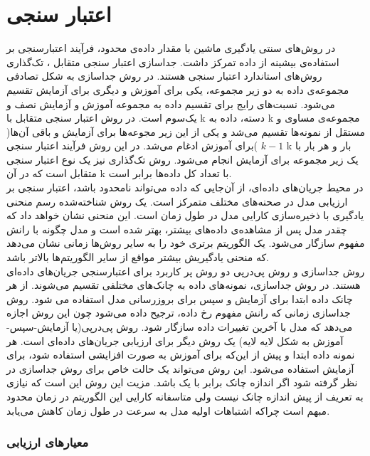 \section{اعتبار سنجی}
در روش‌های سنتی یادگیری ماشین با مقدار داده‌ی محدود، فرآیند اعتبارسنجی بر استفاده‌ی بیشینه از داده تمرکز داشت. جداسازی
اعتبار سنجی متقابل
، تک‌گذاری
روش‌های استاندارد اعتبار سنجی هستند. در روش جداسازی به شکل تصادفی مجموعه‌ی داده به دو زیر مجموعه، یکی برای آموزش و دیگری برای آزمایش تقسیم می‌شود. نسبت‌های رایج برای تقسیم داده به مجموعه آموزش و آزمایش نصف و یک‌سوم است. در روش اعتبار سنجی متقابل با k دسته، داده به k مجموعه‌ی مساوی و مستقل از نمونه‌ها تقسیم می‌شد و یکی از این زیر مجوعه‌ها برای آزمایش و باقی آن‌ها( $k-1$ )برای آموزش ادغام می‌شد. در این روش فرآیند اعتبار سنجی k بار و هر بار با یک زیر مجموعه برای آزمایش انجام می‌شود. روش تک‌گذاری نیز یک نوع اعتبار سنجی متقابل است که در آن k با تعداد کل داده‌ها برابر است.
\\
در محیط جریان‌های داده‌ای، از آن‌جایی که داده می‌تواند نامحدود باشد، اعتبار سنجی بر ارزیابی مدل در صحنه‌های مختلف متمرکز است. یک روش شناخته‌شده رسم منحنی یادگیری با ذخیره‌سازی کارایی مدل در طول زمان است. این منحنی نشان‌ خواهد داد که چقدر مدل پس از مشاهده‌ی داده‌های بیشتر، بهتر شده است و مدل چگونه با رانش‌ مفهوم سازگار می‌شود. یک الگوریتم برتری خود را به سایر روش‌ها زمانی نشان می‌‌دهد که منحنی یادگیریش بیشتر مواقع از سایر الگوریتم‌ها بالا‌تر باشد.
\\
روش جداسازی و روش پی‌درپی
دو روش پر کاربرد برای اعتبارسنجی جریان‌های داده‌ای هستند. در روش جداسازی، نمونه‌های داده به چانک‌های مختلفی تقسیم می‌شوند. از هر چانک داده ابتدا برای آزمایش و سپس برای بروزرسانی مدل استفاده می شود. روش جداسازی زمانی که رانش‌ مفهوم رخ داده، ترجیح داده می‌شود چون این روش اجازه می‌دهد که مدل با آخرین تغییرات داده سازگار شود. روش پی‌در‌پی(یا آزمایش-سپس-آموزش
به شکل لایه‌ لایه) یک روش دیگر برای ارزیابی جریان‌های داده‌ای است. هر نمونه داده ابتدا و پیش از این‌که برای آموزش به صورت افزایشی استفاده شود، برای آزمایش استفاده می‌شود. این روش می‌تواند یک حالت خاص برای روش جداسازی در نظر گرفته شود اگر اندازه چانک برابر با یک باشد. مزیت این روش این است که نیازی به تعریف از پیش اندازه چانک نیست ولی متاسفانه کارایی این الگوریتم در زمان محدود  مبهم است چراکه اشتباهات اولیه مدل به سرعت در طول زمان کاهش می‌یابد.


\subsubsection{معیارهای ارزیابی}



